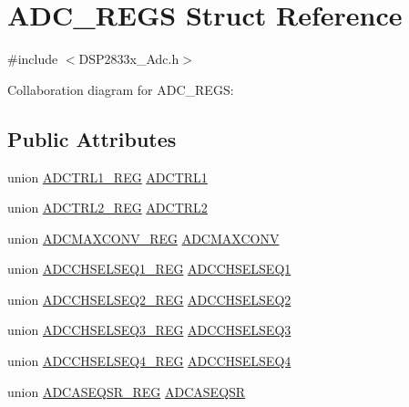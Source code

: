\hypertarget{struct_a_d_c___r_e_g_s}{}\section{A\+D\+C\+\_\+\+R\+E\+G\+S Struct Reference}
\label{struct_a_d_c___r_e_g_s}


{\ttfamily \#include $<$D\+S\+P2833x\+\_\+\+Adc.\+h$>$}



Collaboration diagram for A\+D\+C\+\_\+\+R\+E\+G\+S\+:
\subsection*{Public Attributes}
\begin{DoxyCompactItemize}
\item 
union \hyperlink{union_a_d_c_t_r_l1___r_e_g}{A\+D\+C\+T\+R\+L1\+\_\+\+R\+E\+G} \hyperlink{struct_a_d_c___r_e_g_s_a6c5b3a34bbe99a525e469930583b5538}{A\+D\+C\+T\+R\+L1}
\item 
union \hyperlink{union_a_d_c_t_r_l2___r_e_g}{A\+D\+C\+T\+R\+L2\+\_\+\+R\+E\+G} \hyperlink{struct_a_d_c___r_e_g_s_a86682ad7a3011e4f4453504bb1ff8d53}{A\+D\+C\+T\+R\+L2}
\item 
union \hyperlink{union_a_d_c_m_a_x_c_o_n_v___r_e_g}{A\+D\+C\+M\+A\+X\+C\+O\+N\+V\+\_\+\+R\+E\+G} \hyperlink{struct_a_d_c___r_e_g_s_a09d4f20bd7d04fdfcdb2f5411e6ad0fb}{A\+D\+C\+M\+A\+X\+C\+O\+N\+V}
\item 
union \hyperlink{union_a_d_c_c_h_s_e_l_s_e_q1___r_e_g}{A\+D\+C\+C\+H\+S\+E\+L\+S\+E\+Q1\+\_\+\+R\+E\+G} \hyperlink{struct_a_d_c___r_e_g_s_ab3dc7f6bbc9261fcebfcfbf6b23e9ca0}{A\+D\+C\+C\+H\+S\+E\+L\+S\+E\+Q1}
\item 
union \hyperlink{union_a_d_c_c_h_s_e_l_s_e_q2___r_e_g}{A\+D\+C\+C\+H\+S\+E\+L\+S\+E\+Q2\+\_\+\+R\+E\+G} \hyperlink{struct_a_d_c___r_e_g_s_a6bce6d1034eb8933cf719b4d1b5902cf}{A\+D\+C\+C\+H\+S\+E\+L\+S\+E\+Q2}
\item 
union \hyperlink{union_a_d_c_c_h_s_e_l_s_e_q3___r_e_g}{A\+D\+C\+C\+H\+S\+E\+L\+S\+E\+Q3\+\_\+\+R\+E\+G} \hyperlink{struct_a_d_c___r_e_g_s_a581890663281dbaefe7bc45e52fb4346}{A\+D\+C\+C\+H\+S\+E\+L\+S\+E\+Q3}
\item 
union \hyperlink{union_a_d_c_c_h_s_e_l_s_e_q4___r_e_g}{A\+D\+C\+C\+H\+S\+E\+L\+S\+E\+Q4\+\_\+\+R\+E\+G} \hyperlink{struct_a_d_c___r_e_g_s_ac62ccae71e931a526877a8a53be3d22d}{A\+D\+C\+C\+H\+S\+E\+L\+S\+E\+Q4}
\item 
union \hyperlink{union_a_d_c_a_s_e_q_s_r___r_e_g}{A\+D\+C\+A\+S\+E\+Q\+S\+R\+\_\+\+R\+E\+G} \hyperlink{struct_a_d_c___r_e_g_s_a0a3d114f1e0742f4c81e551dd1725d45}{A\+D\+C\+A\+S\+E\+Q\+S\+R}

\end{DoxyCompactItemize}
